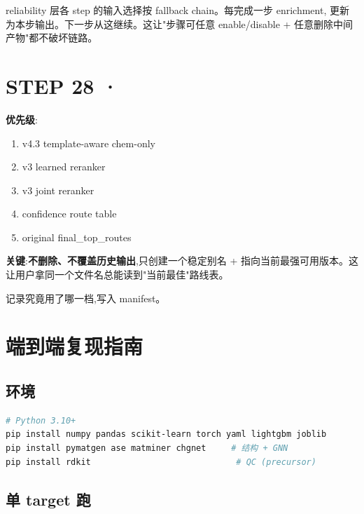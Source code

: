 reliability 层各 step 的输入选择按 fallback chain。每完成一步 enrichment, 更新  为本步输出。下一步从这继续。这让"步骤可任意 enable/disable + 任意删除中间产物"都不破坏链路。

\section{STEP 28 · }

\textbf{优先级}:
\begin{enumerate}
    \item v4.3 template-aware chem-only
    \item v3 learned reranker
    \item v3 joint reranker
    \item confidence route table
    \item original final\_top\_routes
\end{enumerate}

\textbf{关键}:\textbf{不删除、不覆盖历史输出},只创建一个稳定别名  +  指向当前最强可用版本。这让用户拿同一个文件名总能读到"当前最佳"路线表。

 记录究竟用了哪一档,写入 manifest。

\section{端到端复现指南}

\subsection{环境}

\begin{lstlisting}[language=bash]
# Python 3.10+
pip install numpy pandas scikit-learn torch yaml lightgbm joblib
pip install pymatgen ase matminer chgnet     # 结构 + GNN
pip install rdkit                             # QC (precursor)
\end{lstlisting}

\subsection{单 target 跑}

